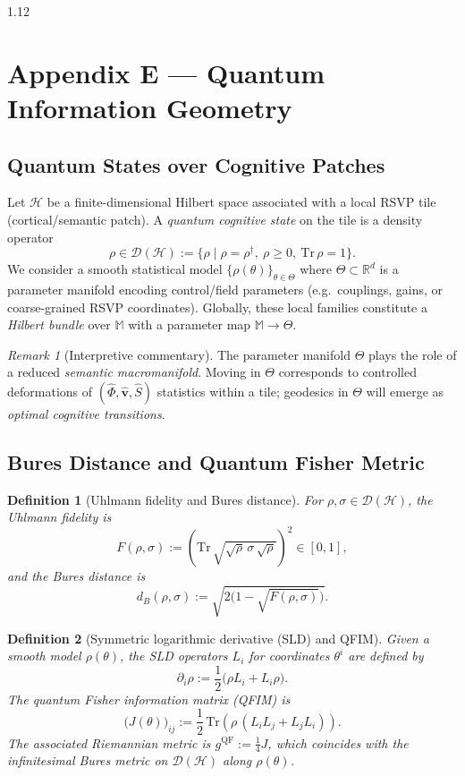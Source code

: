 \documentclass[12pt,a4paper]{article}
\numberwithin{equation}{section}
\newtheorem{definition}{Definition}[section]
\theoremstyle{remark}
\newtheorem{remark}{Remark}[section]
\theoremstyle{definition}
\begin{document}
\begin{spacing}{1.12}
\section*{Appendix E — Quantum Information Geometry}
\label{appendix:E}

\subsection{Quantum States over Cognitive Patches}\label{sec:E-setup}

Let $\mathcal{H}$ be a finite-dimensional Hilbert space associated with a local RSVP tile (cortical/semantic patch). A \emph{quantum cognitive state} on the tile is a density operator
\[
\rho \in \mathcal{D}(\mathcal{H}) := \{\rho\;|\;\rho=\rho^\dagger,\ \rho\ge 0,\ \mathrm{Tr}\,\rho=1\}.
\]
We consider a smooth statistical model $\{\rho(\theta)\}_{\theta\in\Theta}$ where $\Theta\subset\mathbb{R}^d$ is a parameter manifold encoding control/field parameters (e.g.\ couplings, gains, or coarse-grained RSVP coordinates). Globally, these local families constitute a \emph{Hilbert bundle} over $\mathbb{M}$ with a parameter map $\mathbb{M}\to \Theta$.

\begin{remark}[Interpretive commentary]
The parameter manifold $\Theta$ plays the role of a reduced \emph{semantic macromanifold}. Moving in $\Theta$ corresponds to controlled deformations of $(\hat{\Phi},\hat{\mathbf{v}},\hat{S})$ statistics within a tile; geodesics in $\Theta$ will emerge as \emph{optimal cognitive transitions}.
\end{remark}

\subsection{Bures Distance and Quantum Fisher Metric}\label{sec:E-bures-qfi}

\begin{definition}[Uhlmann fidelity and Bures distance]\label{def:E-bures}
For $\rho,\sigma\in\mathcal{D}(\mathcal{H})$, the Uhlmann fidelity is
\[
F(\rho,\sigma) := \left(\mathrm{Tr}\,\sqrt{\sqrt{\rho}\,\sigma\,\sqrt{\rho}}\right)^2\in[0,1],
\]
and the Bures distance is
\[
d_B(\rho,\sigma) := \sqrt{2\bigl(1-\sqrt{F(\rho,\sigma)}\bigr)}.
\]
\end{definition}

\begin{definition}[Symmetric logarithmic derivative (SLD) and QFIM]\label{def:E-SLD}
Given a smooth model $\rho(\theta)$, the SLD operators $L_i$ for coordinates $\theta^i$ are defined by
\[
\partial_i \rho := \frac{1}{2}\bigl(\rho L_i + L_i \rho\bigr).
\]
The \emph{quantum Fisher information matrix} (QFIM) is
\[
\bigl(J(\theta)\bigr)_{ij} := \frac{1}{2}\,\mathrm{Tr}\!\left(\rho\,(L_iL_j+L_jL_i)\right).
\]
The associated Riemannian metric is $g^{\mathrm{QF}}:=\tfrac{1}{4}J$, which coincides with the infinitesimal Bures metric on $\mathcal{D}(\mathcal{H})$ along $\rho(\theta)$.
\end{definition}


\end{spacing}
\end{document}
